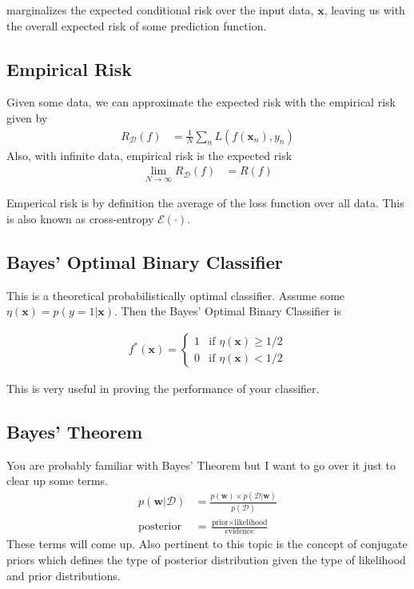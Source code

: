 \documentclass[11pt]{article}
\newcommand{\vct}[1]{\boldsymbol{#1}} %
\begin{document}
 marginalizes the expected conditional risk over the input data, $\vct{x}$, leaving us with the overall expected risk of some prediction function.
 
 \subsection{Empirical Risk}
 Given some data, we can approximate the expected risk with the empirical risk given by
\begin{align*}
R_{\mathcal{D}}(f) &= \frac{1}{N} \sum_n L(f(\vct{x}_n),y_n)
\end{align*}
Also, with infinite data, empirical risk is the expected risk
\begin{align*}
\lim_{N \to \infty} R_{\mathcal{D}}(f) &= R(f)
\end{align*}

Emperical risk is by definition the average of the loss function over all data. This is also known as cross-entropy $\mathcal{E}(\cdot)$. 
 
\subsection{Bayes' Optimal Binary Classifier}
This is a theoretical probabilistically optimal classifier. Assume some $\eta(\vct{x}) = p(y=1|\vct{x})$. Then the Bayes' Optimal Binary Classifier is

\begin{align*}
f^*(\vct{x}) =  \begin{cases} 1 & \text{if } \eta(\vct{x}) \ge 1/2 \\
0 & \text{if } \eta(\vct{x}) < 1/2 \end{cases} 
\end{align*}

This is very useful in proving the performance of your classifier.

\subsection{Bayes' Theorem}

You are probably familiar with Bayes' Theorem but I want to go over it just to clear up some terms. 
\begin{align*}
p(\vct{w}|\mathcal{D}) &= \frac{p(\vct{w}) \times p(\mathcal{D}|\vct{w})}{p(\mathcal{D})}\\
\text{posterior} &= \frac{\text{prior} \times \text{likelihood}}{\text{evidence}}
\end{align*}
These terms will come up. Also pertinent to this topic is the concept of conjugate priors which defines the type of posterior distribution given the type of likelihood and prior distributions.
\end{document}
